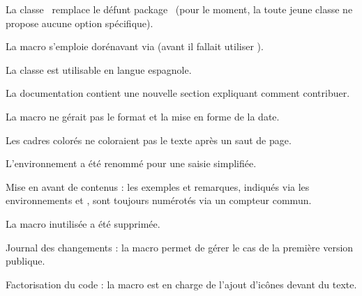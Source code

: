 \begin{tdocbreak}
    \item La classe \thisproj\ remplace le défunt package \thisproj\ (pour le moment, la toute jeune classe ne propose aucune option spécifique).

    \item La macro  s'emploie dorénavant via  (avant il fallait utiliser ).
\end{tdocbreak}


\begin{tdocnew}
    \item La classe est utilisable en langue espagnole.

    \item La documentation contient une nouvelle section expliquant comment contribuer.
\end{tdocnew}


\begin{tdocfix}
    \item La macro  ne gérait pas le format et la mise en forme de la date.

    \item Les cadres colorés ne coloraient pas le texte après un saut de page.
\end{tdocfix}

\tdocsep




\begin{tdocbreak}[version = 1.4.0, date = 2024-09-28]
    \item L'environnement  a été renommé  pour une saisie simplifiée.

    \item Mise en avant de contenus : les exemples et remarques, indiqués via les environnements  et , sont toujours numérotés via un compteur commun.

    \item La macro inutilisée  a été supprimée.
\end{tdocbreak}


\begin{tdocnew}
    \item Journal des changements : la macro  permet de gérer le cas de la première version publique.

    \item Factorisation du code : la macro  est en charge de l'ajout d'icônes devant du texte.
\end{tdocnew}


